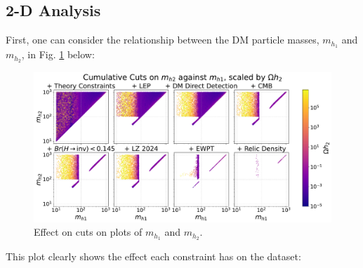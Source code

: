 \documentclass[12pt]{article}
\newcommand{\mhone}{m_{h_1}}
\newcommand{\mhtwo}{m_{h_2}}
\begin{document}
\subsection{2-D Analysis}
\label{sec:2D-proj}
First, one can consider the relationship between the DM particle masses, $\mhone$ and $\mhtwo$, in Fig. \ref{fig:MD2_against_MD1} below: 
\begin{figure}[H]
    \centering
    \includegraphics[width=\linewidth]{big_plots_(low_dpi)/MD2_against_MD1_Omegah2.pdf}
    \caption{Effect on cuts on plots of $\mhone$ and $\mhtwo$.}
    \label{fig:MD2_against_MD1}
\end{figure}
This plot clearly shows the effect each constraint has on the dataset:
\end{document}
